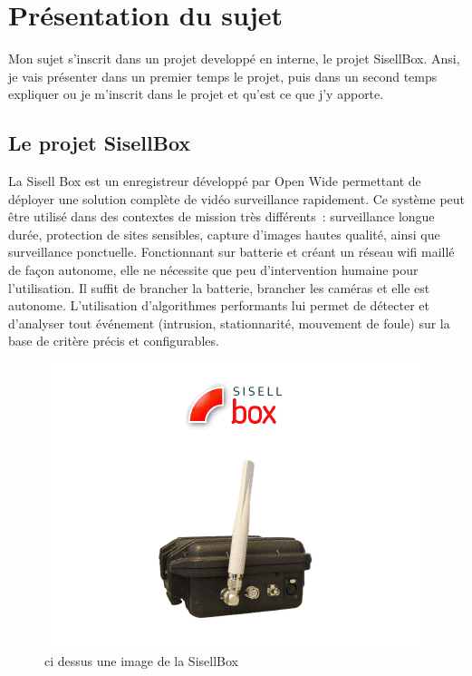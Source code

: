\section{Présentation du sujet}
Mon sujet s'inscrit dans un projet developpé en interne, le projet SisellBox. Ansi,
je vais présenter dans un premier temps le projet, puis dans un second temps
expliquer ou je m'inscrit dans le projet et qu'est ce que j'y apporte.

\subsection{Le projet SisellBox}
  La Sisell Box est un enregistreur développé par Open Wide permettant de déployer une solution complète de vidéo surveillance rapidement.
  Ce système peut être utilisé dans des contextes de mission très différents : surveillance longue durée, protection de sites sensibles, capture d'images hautes qualité, ainsi que surveillance ponctuelle.
  Fonctionnant sur batterie et créant un réseau wifi maillé de façon autonome, elle ne nécessite que peu d'intervention humaine pour l'utilisation. Il suffit de brancher la batterie, brancher les caméras et elle est autonome. L'utilisation d'algorithmes performants lui permet de détecter et d'analyser tout événement (intrusion, stationnarité, mouvement de foule) sur la base de critère précis et configurables.
\begin{figure}[!h]
  \centering
  \includegraphics{figures/sbox}
  \caption{ci dessus une image de la SisellBox}
\end{figure}
\newpage

